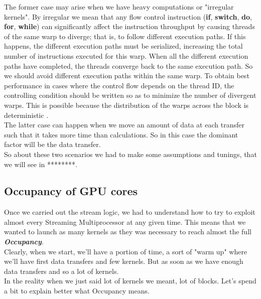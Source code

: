 	The former case may arise when we have heavy computations or "irregular kernels".
	By irregular we mean that any flow control instruction (\textbf{if}, \textbf{switch}, \textbf{do}, \textbf{for}, \textbf{while}) can significantly affect the instruction throughput by causing threads of the same warp to diverge; that is, to follow different execution paths. 
	If this happens, the different execution paths must be serialized, increasing the total number of instructions executed for this warp. When all the different execution paths have completed, the threads converge back to the same execution path.	
	So we should avoid different execution paths within the same warp. To obtain best performance in cases where the control flow depends on the thread ID, the controlling condition should be written so as to minimize the number of divergent warps. This is possible because the distribution of the warps across the block is deterministic
	\cite{cudaguide}.\\
	
	The latter case can happen when we move an amount of data at each transfer such that it takes more time than calculations. So in this case the dominant factor will be the data transfer.\\
	
	So about these two scenarios we had to make some assumptions and tunings, that we will see in ********. 
	
	
	
	
	\subsection{Occupancy of GPU cores}
	Once we carried out the stream logic, we had to understand how to try to exploit almost every Streaming Multiprocessor at any given time.
	This means that we wanted to launch as many kernels as they was necessary to reach almost the full \textit{\textbf{Occupancy}}.\\
	Clearly, when we start, we'll have a portion of time, a sort of "warm up" where we'll have first data transfers and few kernels. 
	But as soon as we have enough data transfers and so a lot of kernels.\\
	
	In the reality when we just said lot of kernels we meant, lot of blocks. Let's spend a bit to explain better what Occupancy means.\\

